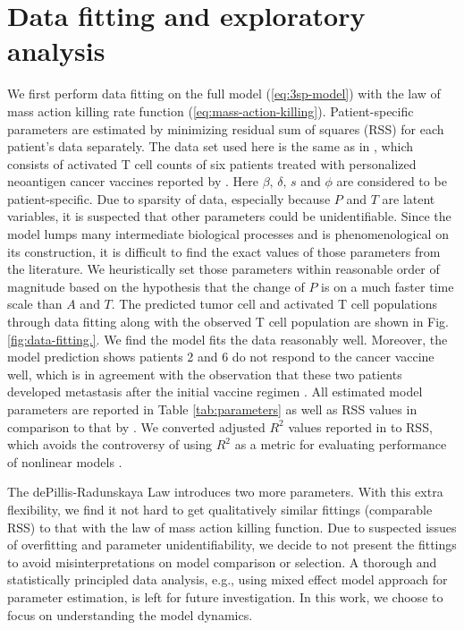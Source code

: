 \documentclass[review,authoryear]{elsarticle}
\begin{document}
\section{Data fitting and exploratory analysis} \label{sec:data}
We first perform data fitting on the full model (\ref{eq:3sp-model}) with the law of mass action killing rate function (\ref{eq:mass-action-killing}). Patient-specific parameters are estimated by minimizing residual sum of squares (RSS) for each patient's data separately. The data set used here is the same as in \cite{Messan2021}, which consists of activated T cell counts of six patients treated with personalized neoantigen cancer vaccines reported by \cite{Ott2017}. Here $\beta,\, \delta,\, s$ and $\phi$ are considered to be patient-specific. Due to sparsity of data, especially because $P$ and $T$ are latent variables, it is suspected that other parameters could be unidentifiable.  Since the model lumps many intermediate biological processes and is phenomenological on its construction, it is difficult to find the exact values of those parameters from the literature. We heuristically set those parameters within reasonable order of magnitude based on the hypothesis that the change of $P$ is on a much faster time scale than $A$ and $T$. The predicted tumor cell and activated T cell populations through data fitting along with the observed T cell population are shown in Fig. \ref{fig:data-fitting.}. We find the model fits the data reasonably well. Moreover, the model prediction shows patients 2 and 6 do not respond to the cancer vaccine well, which is in agreement with the observation that these two patients developed metastasis after the initial vaccine regimen \citep{Ott2017}. All estimated model parameters are reported in Table \ref{tab:parameters} as well as RSS values in comparison to that by \cite{Messan2021}. We converted adjusted $R^2$ values reported in \cite{Messan2021} to RSS, which avoids the controversy of using $R^2$ as a metric for evaluating performance of nonlinear models \citep{Spiess2010}. 

The dePillis-Radunskaya Law introduces two more parameters. With this extra flexibility, we find it not hard to get qualitatively similar fittings (comparable RSS) to that with the law of mass action killing function. Due to suspected issues of overfitting and parameter unidentifiability, we decide to not present the fittings to avoid misinterpretations on model comparison or selection. A thorough and statistically principled data analysis, e.g., using mixed effect model approach for parameter estimation, is left for future investigation. In this work, we choose to focus on understanding the model dynamics.
\end{document}
